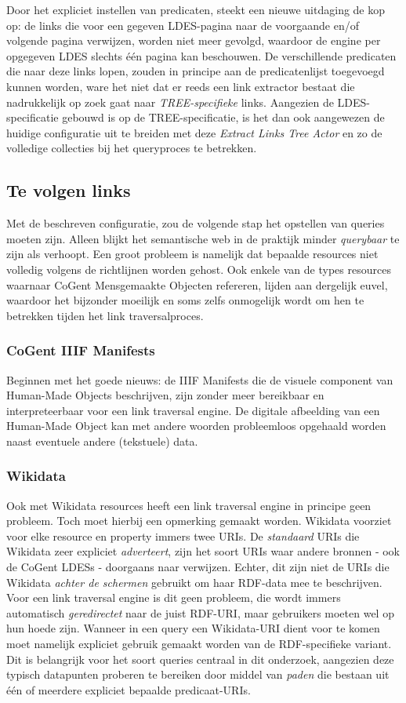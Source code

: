 \documentclass[conference]{IEEEtran}
\begin{document}
Door het expliciet instellen van predicaten, steekt een nieuwe uitdaging de kop op: de links die voor een gegeven LDES-pagina naar de voorgaande en/of volgende pagina verwijzen, worden niet meer gevolgd, waardoor de engine per opgegeven LDES slechts één pagina kan beschouwen. De verschillende predicaten die naar deze links lopen, zouden in principe aan de predicatenlijst toegevoegd kunnen worden, ware het niet dat er reeds een link extractor bestaat die nadrukkelijk op zoek gaat naar \textit{TREE-specifieke} links. Aangezien de LDES-specificatie gebouwd is op de TREE-specificatie, is het dan ook aangewezen de huidige configuratie uit te breiden met deze \textit{Extract Links Tree Actor} en zo de volledige collecties bij het queryproces te betrekken. \cite{colpaert2023tree}

\subsection{Te volgen links}
Met de beschreven configuratie, zou de volgende stap het opstellen van queries moeten zijn. Alleen blijkt het semantische web in de praktijk minder \textit{querybaar} te zijn als verhoopt. Een groot probleem is namelijk dat bepaalde resources niet volledig volgens de richtlijnen worden gehost. Ook enkele van de types resources waarnaar CoGent Mensgemaakte Objecten refereren, lijden aan dergelijk euvel, waardoor het bijzonder moeilijk en soms zelfs onmogelijk wordt om hen te betrekken tijden het link traversalproces.

\subsubsection{CoGent IIIF Manifests}
Beginnen met het goede nieuws: de IIIF Manifests die de visuele component van Human-Made Objects beschrijven, zijn zonder meer bereikbaar en interpreteerbaar voor een link traversal engine. De digitale afbeelding van een Human-Made Object kan met andere woorden probleemloos opgehaald worden naast eventuele andere (tekstuele) data.

\subsubsection{Wikidata}
Ook met Wikidata resources heeft een link traversal engine in principe geen probleem. Toch moet hierbij een opmerking gemaakt worden. Wikidata voorziet voor elke resource en property immers twee URIs. De \textit{standaard} URIs die Wikidata zeer expliciet \textit{adverteert}, zijn het soort URIs waar andere bronnen - ook de CoGent LDESs - doorgaans naar verwijzen. Echter, dit zijn niet de URIs die Wikidata \textit{achter de schermen} gebruikt om haar RDF-data mee te beschrijven. Voor een link traversal engine is dit geen probleem, die wordt immers automatisch \textit{geredirectet} naar de juist RDF-URI, maar gebruikers moeten wel op hun hoede zijn. Wanneer in een query een Wikidata-URI dient voor te komen moet namelijk expliciet gebruik gemaakt worden van de RDF-specifieke variant. Dit is belangrijk voor het soort queries centraal in dit onderzoek, aangezien deze typisch datapunten proberen te bereiken door middel van \textit{paden} die bestaan uit één of meerdere expliciet bepaalde predicaat-URIs.
\end{document}
